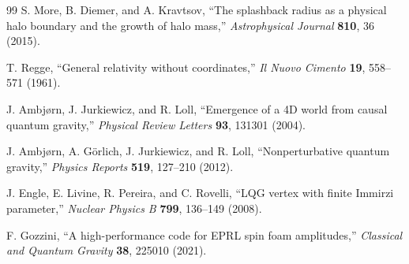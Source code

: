 \documentclass[11pt]{article}
\begin{document}
\begin{thebibliography}{99}
S. More, B. Diemer, and A. Kravtsov,
``The splashback radius as a physical halo boundary and the growth of halo mass,''
\emph{Astrophysical Journal} \textbf{810}, 36 (2015).

T. Regge,
``General relativity without coordinates,''
\emph{Il Nuovo Cimento} \textbf{19}, 558--571 (1961).

J. Ambj{\o}rn, J. Jurkiewicz, and R. Loll,
``Emergence of a 4D world from causal quantum gravity,''
\emph{Physical Review Letters} \textbf{93}, 131301 (2004).

J. Ambj{\o}rn, A. G{\"o}rlich, J. Jurkiewicz, and R. Loll,
``Nonperturbative quantum gravity,''
\emph{Physics Reports} \textbf{519}, 127--210 (2012).

J. Engle, E. Livine, R. Pereira, and C. Rovelli,
``LQG vertex with finite Immirzi parameter,''
\emph{Nuclear Physics B} \textbf{799}, 136--149 (2008).

F. Gozzini,
``A high-performance code for EPRL spin foam amplitudes,''
\emph{Classical and Quantum Gravity} \textbf{38}, 225010 (2021).

\end{thebibliography}
\end{document}

